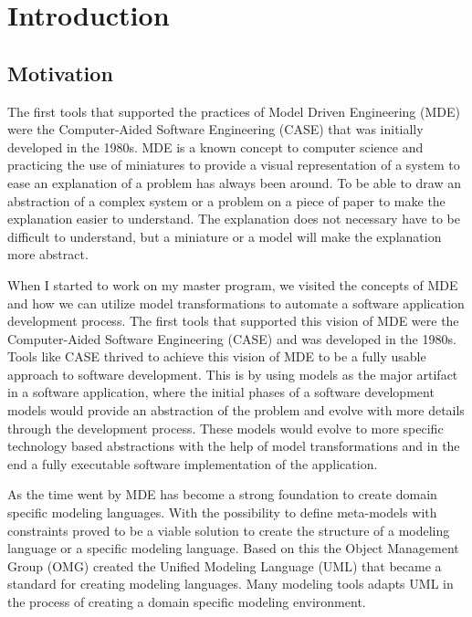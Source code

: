 \chapter{Introduction} %

\label{introduction} %

\singlespacing

\section{Motivation}

The first tools that supported the practices of Model Driven Engineering (MDE)
were the Computer-Aided Software Engineering\cite{premkumar1995adoption} (CASE)
that was initially developed in the 1980s. MDE is a known concept to computer
science and practicing the use of miniatures to provide a visual representation
of a system to ease an explanation of a problem has always been around. To be
able to draw an abstraction of a complex system or a problem on a piece of
paper to make the explanation easier to understand. The explanation does not
necessary have to be difficult to understand, but a miniature or a model will
make the explanation more abstract.

When I started to work on my master program, we visited the concepts
of MDE and how we can utilize model transformations to automate a
software application development process. The first tools that supported this
vision of MDE were the Computer-Aided Software Engineering (CASE) and was developed in the
1980s. Tools like CASE thrived to achieve this vision of MDE to be a fully
usable approach to software development. This is by using models as the major
artifact in a software application, where the initial phases of a
software development models would provide an abstraction of the problem and
evolve with more details through the development process. These models would
evolve to more specific technology based abstractions with the help of model
transformations and in the end a fully executable software implementation of
the application.

As the time went by MDE has become a strong foundation to create domain
specific modeling languages. With the possibility to define meta-models with
constraints proved to be a viable solution to create the structure of a
modeling language or a specific modeling language. Based on this the Object
Management Group (OMG) created the Unified Modeling Language\cite{UML_SPEC}
(UML) that became a standard for creating modeling languages. Many modeling
tools adapts UML in the process of creating a domain specific modeling
environment.


